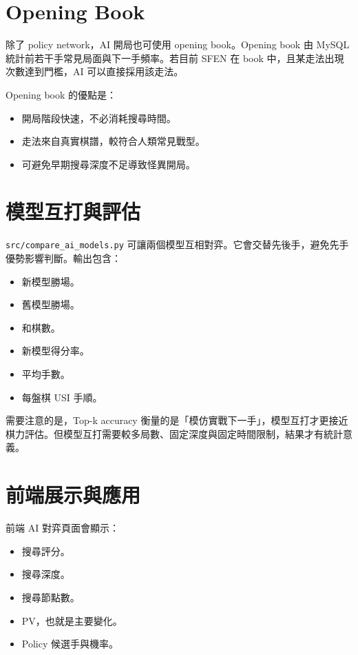\documentclass[12pt,a4paper,fontset=none]{ctexart}
\begin{document}
\section{Opening Book}

除了 policy network，AI 開局也可使用 opening book。Opening book 由 MySQL 統計前若干手常見局面與下一手頻率。若目前 SFEN 在 book 中，且某走法出現次數達到門檻，AI 可以直接採用該走法。

Opening book 的優點是：

\begin{itemize}
  \item 開局階段快速，不必消耗搜尋時間。
  \item 走法來自真實棋譜，較符合人類常見戰型。
  \item 可避免早期搜尋深度不足導致怪異開局。
\end{itemize}

\section{模型互打與評估}

\texttt{src/compare\_ai\_models.py} 可讓兩個模型互相對弈。它會交替先後手，避免先手優勢影響判斷。輸出包含：

\begin{itemize}
  \item 新模型勝場。
  \item 舊模型勝場。
  \item 和棋數。
  \item 新模型得分率。
  \item 平均手數。
  \item 每盤棋 USI 手順。
\end{itemize}

需要注意的是，Top-k accuracy 衡量的是「模仿實戰下一手」，模型互打才更接近棋力評估。但模型互打需要較多局數、固定深度與固定時間限制，結果才有統計意義。

\section{前端展示與應用}

前端 AI 對弈頁面會顯示：

\begin{itemize}
  \item 搜尋評分。
  \item 搜尋深度。
  \item 搜尋節點數。
  \item PV，也就是主要變化。
  \item Policy 候選手與機率。
\end{itemize}
\end{document}
